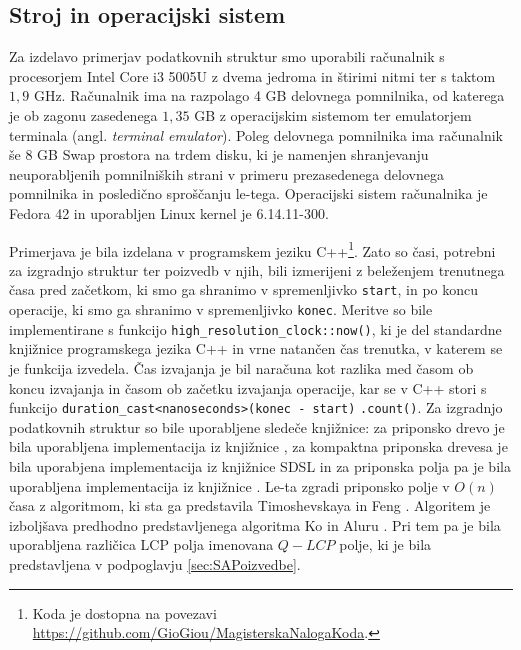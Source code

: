 \subsection{Stroj in operacijski sistem}
Za izdelavo primerjav podatkovnih struktur smo uporabili računalnik s procesorjem Intel Core i3 5005U z dvema jedroma in štirimi nitmi ter s taktom $1,9$ GHz. Računalnik ima na razpolago 4 GB delovnega pomnilnika, od katerega je ob zagonu zasedenega $1,35$ GB z operacijskim sistemom ter emulatorjem terminala (angl. \textit{terminal emulator}). Poleg delovnega pomnilnika ima računalnik še $8$ GB Swap prostora na trdem disku, ki je namenjen shranjevanju neuporabljenih pomnilniških strani v primeru prezasedenega delovnega pomnilnika in posledično sproščanju le-tega. Operacijski sistem računalnika je Fedora 42 in uporabljen Linux kernel je 6.14.11-300.

Primerjava je bila izdelana v programskem jeziku C++\footnote{Koda je dostopna na povezavi \url{https://github.com/GioGiou/MagisterskaNalogaKoda}.}. Zato so časi, potrebni za izgradnjo struktur ter poizvedb v njih, bili izmerijeni z beleženjem trenutnega časa pred začetkom, ki smo ga shranimo v spremenljivko \verb|start|, in po koncu operacije, ki smo ga shranimo v spremenljivko \verb|konec|. Meritve so bile implementirane s funkcijo \verb|high_resolution_clock::now()|, ki je del standardne knjižnice programskega jezika C++ in vrne natančen čas trenutka, v katerem se je funkcija izvedela. Čas izvajanja je bil naračuna kot razlika med časom ob koncu izvajanja in časom ob začetku izvajanja operacije, kar se v C++ stori s funkcijo \verb|duration_cast<nanoseconds>(konec - start)| \verb|.count()|. Za izgradnjo podatkovnih struktur so bile uporabljene sledeče knjižnice: za priponsko drevo je bila uporabljena implementacija iz knjižnice \cite{ganeshk13}, za kompaktna priponska drevesa je bila uporabjena implementacija iz knjižnice SDSL \cite{gbmp2014sea} in za priponska polja pa je bila uporabljena implementacija iz knjižnice \cite{Grebnov2025}. Le-ta zgradi priponsko polje v $O(n)$ časa z algoritmom, ki sta ga predstavila Timoshevskaya in Feng \cite{Timoshevskaya2014}. Algoritem je izboljšava predhodno predstavljenega algoritma Ko in Aluru \cite{Ko2005}. Pri tem pa je bila uporabljena različica LCP polja imenovana $Q-LCP$ polje, ki je bila predstavljena v podpoglavju \ref{sec:SAPoizvedbe}.

